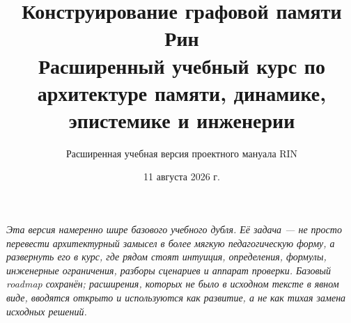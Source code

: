 \documentclass[11pt,a4paper]{extbook}
\title{Конструирование графовой памяти Рин\\[0.4em]
\large Расширенный учебный курс по архитектуре памяти, динамике, эпистемике и инженерии}
\author{Расширенная учебная версия проектного мануала RIN}
\date{11 августа 2026 г.}
\theoremstyle{definition}
\begin{document}
\frontmatter
\maketitle

\vspace{1.5em}
\begin{center}
\begin{minipage}{0.84\textwidth}\itshape\small
Эта версия намеренно шире базового учебного дубля. Её задача — не просто перевести
архитектурный замысел в более мягкую педагогическую форму, а развернуть его в курс,
где рядом стоят интуиция, определения, формулы, инженерные ограничения, разборы
сценариев и аппарат проверки. Базовый roadmap сохранён; расширения, которых не было
в исходном тексте в явном виде, вводятся открыто и используются как развитие, а не
как тихая замена исходных решений.
\end{minipage}
\end{center}
\vspace{1.5em}

\tableofcontents

\mainmatter




























\appendix









\backmatter

\end{document}
